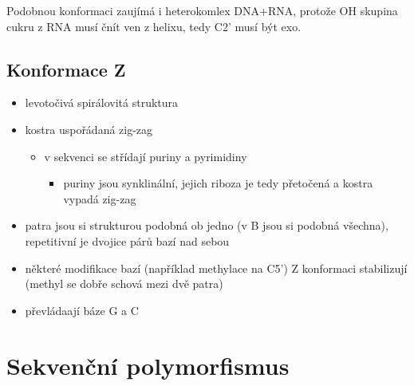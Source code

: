 \documentclass[DIV=8]{scrreprt}
\begin{document}
Podobnou konformaci zaujímá i heterokomlex DNA+RNA, protože OH skupina cukru z RNA musí čnít ven z helixu, tedy C2' musí být exo.

\subsection{Konformace Z} \label{Konformace Z}


\begin{itemize}[nosep]
    \item levotočivá spirálovitá struktura
    \item kostra uspořádaná zig-zag
\begin{itemize}[nosep]
    \item v sekvenci se střídají puriny a pyrimidiny
\begin{itemize}[nosep]
    \item puriny jsou synklinální, jejich riboza je tedy přetočená a kostra vypadá zig-zag
\end{itemize}

\end{itemize}

    \item patra jsou si strukturou podobná ob jedno (v B jsou si podobná všechna), repetitivní je dvojice párů bazí nad sebou
    \item některé modifikace bazí (například methylace na C5') Z konformaci stabilizují (methyl se dobře schová mezi dvě patra)
    \item převládaají báze G a C
\end{itemize}



\section{Sekvenční polymorfismus} \label{Sekvenční polymorfismus}
\end{document}
